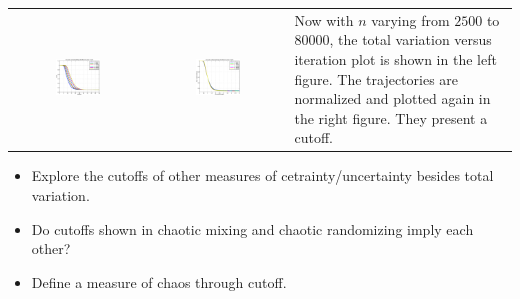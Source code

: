 \documentclass[landscape,a0b,final]{a0poster}
\newenvironment{poster}{
  \begin{center}
  \begin{minipage}[c]{0.98\textwidth}
}{
  \end{minipage} 
  \end{center}
}
\newenvironment{pcolumn}[1]{
  \begin{minipage}{#1\textwidth}
  \begin{center}
}{
  \end{center}
  \end{minipage}
}
\newcommand{\pbox}[4]{
\psshadowbox[#3]{
\begin{minipage}[t][#2][t]{#1}
#4
\end{minipage}
}}
\begin{document}
\begin{poster}
\begin{center}
\begin{pcolumn}{0.32}
{\begin{tabular}{cc|l}
   
        \includegraphics[width=0.35\textwidth,trim=0cm 0cm 0cm 0cm]{standardmapcutoff}&
	\includegraphics[width=0.35\textwidth,trim=0cm 0cm 0cm 0cm]{standardmapcutoffn}&
   \begin{minipage}[b]{0.28\hsize}
    Now with $n$ varying from $2500$ to $80000$, the total variation versus iteration plot is shown in the left figure. The  trajectories are normalized and plotted again in the right figure. They present a cutoff.
    \end{minipage} 
\end{tabular}










\begin{center}\pbox{0.8\textwidth}{}{linewidth=2mm,framearc=0.1,linecolor=red,fillstyle=gradient,gradangle=0,gradbegin=white,gradend=whitered,gradmidpoint=1.0,framesep=1em}{\begin{center}\bfseries{\large{Future Work}}\end{center}}\end{center}\vspace{0.5cm}

\begin{itemize}
\item Explore the cutoffs of other measures of cetrainty/uncertainty besides total variation. 
\item Do cutoffs shown in chaotic mixing and chaotic randomizing imply each other?
\item Define a measure of chaos through cutoff. 
\end{itemize}

}
\end{pcolumn}
\end{center}
\end{poster}
\end{document}
